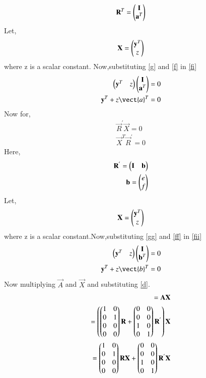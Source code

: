 \documentclass[journal,12pt,twocolumn]{IEEEtran}
\begin{document}
\begin{enumerate}
\begin{align}
  \mathbf{R}^{T}=\begin{pmatrix}\mathbf{I}\\\mathbf{a}^T\end{pmatrix}
  \end{align}
  Let,
  \begin{align}
  \mathbf{X}=\begin{pmatrix}\mathbf{y}^T\\z\end{pmatrix}\label{g}
  \end{align}
  where z is a scalar constant. Now,substituting \eqref{g} and \eqref{f} in \eqref{fi}
  \begin{align}
  \myvec{\vec{y}^T&z}\myvec{\vec{I}\\\vec{a}^T}=0\\
  \vec{y}^T+z\vect{a}^T=0\label{49}
  \end{align}
  Now for,
  \begin{align}
  \vec{R}^{'}\vec{X}=0\label{ee}\\
  \vec{X}^{T}\vec{R}^{'}=0\label{fii}
  \end{align}
  Here,
  \begin{align}
  \mathbf{R}^{'}=\begin{pmatrix}\mathbf{I}&\mathbf{b}\end{pmatrix}\label{ff}\\
  \mathbf{b}=\begin{pmatrix}e\\f\end{pmatrix}
  \end{align}
  Let,
  \begin{align}
  \mathbf{X}=\begin{pmatrix}\mathbf{y}^T\\z\end{pmatrix}\label{gg}
  \end{align}
  where z is a scalar constant.Now,substituting \eqref{gg} and \eqref{ff} in \eqref{fii}
  \begin{align}
    \myvec{\vec{y}^T&z}\myvec{\vec{I}\\\vec{b}^T}=0\\
  \vec{y}^T+z\vect{b}^T=0\label{50}
  \end{align}
Now multiplying $\vec{A}$ and $\vec{X}$ and substituting \eqref{d}.
  \begin{align}
  =\vec{A}\vec{X}\\
  =\left(\myvec{1&0\\0&1\\0&0\\0&0}\vec{R}+\myvec{0&0\\0&0\\1&0\\0&1}\vec{R}^{'}\right)\vec{X}\\
  =\myvec{1&0\\0&1\\0&0\\0&0}\vec{R}\vec{X}+\myvec{0&0\\0&0\\1&0\\0&1}\vec{R}^{'}\vec{X} \\

\end{align}
\end{enumerate}
\end{document}

